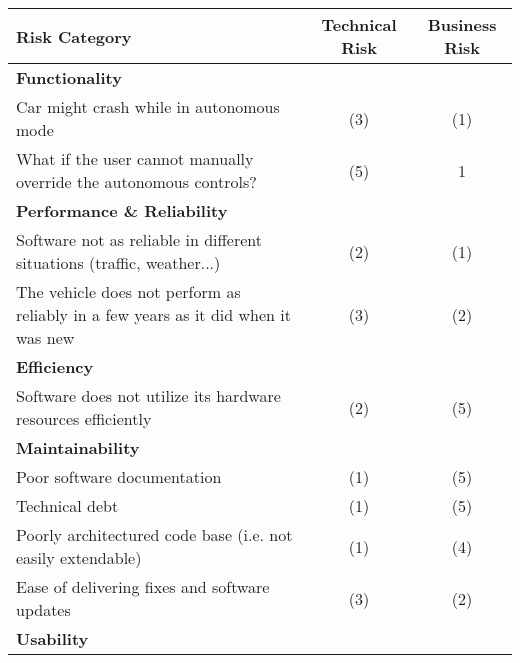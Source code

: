 \documentclass[letterpaper]{article}
\begin{document}
\begin{table}[H]
	\centering
	\begin{tabularx}{\textwidth}{X|c|c|}
		Risk Category                                                                         & Technical Risk & Business Risk \\ \hline
		\textbf{Functionality}                                                                &                &               \\ \hline
		Car might crash while in autonomous mode                                              & (3)            & (1)           \\ \hline
		What if the user cannot manually override the autonomous controls?                    & (5)            & 1             \\ \hline
		\textbf{Performance \& Reliability}                                                            &                &               \\ \hline
		Software not as reliable in different situations (traffic, weather...)                & (2)            & (1)           \\ \hline
		The vehicle does not perform as reliably in a few years as it did when it was new     & (3)            & (2)           \\ \hline
		\textbf{Efficiency}                                                                   &                &               \\ \hline
		Software does not utilize its hardware resources efficiently                          & (2)            & (5)           \\ \hline
		\textbf{Maintainability}                                                              &                &               \\ \hline
		Poor software documentation                                                           & (1)            & (5)           \\ \hline
		Technical debt                                                                        & (1)            & (5)           \\ \hline
		Poorly architectured code base (i.e. not easily extendable)                           & (1)            & (4)           \\ \hline
		Ease of delivering fixes and software updates                                         & (3)            & (2)           \\ \hline
		\textbf{Usability}                                                                    &                &               \\ \hline

\end{tabularx}
\end{table}
\end{document}
